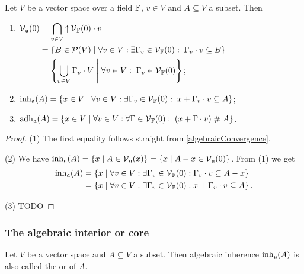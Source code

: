 \begin{lemma}
Let $V$ be a vector space over a field $\mathbb{F}$, $v\in V$ and $A\subseteq V$ a subset. Then
\begin{enumerate}
\item $\begin{aligned}[t]
\operatorname{\mathcal{V}}_\mathfrak{a}(0) &= \bigcap_{v\in V} \operatorname{\uparrow} \operatorname{\mathcal{V}}_{\mathbb{F}}(0)\cdot v \\
&= \left\{ B\in \operatorname{\mathcal{P}}(V) \;\middle|\; \forall v\in V: \exists \Gamma_v\in \operatorname{\mathcal{V}}_{\mathbb{F}}(0):\; \Gamma_v\cdot v\subseteq B \right\} \\
&= \left\{ \bigcup_{v\in V} \Gamma_v\cdot V \;\middle|\; \forall v\in V:\; \Gamma_v \in \operatorname{\mathcal{V}}_{\mathbb{F}}(0) \right\};
\end{aligned}$
\item $\operatorname{inh}_\mathfrak{a}(A) = \left\{ x\in V \;\middle|\; \forall v\in V:\exists \Gamma_v \in \operatorname{\mathcal{V}}_{\mathbb{F}}(0):\; x + \Gamma_v\cdot v \subseteq A \right\}$;
\item $\operatorname{adh}_\mathfrak{a}(A) = \left\{ x\in V \;\middle|\; \forall v\in V: \forall \Gamma\in\operatorname{\mathcal{V}}_{\mathbb{F}}(0):\; (x+\Gamma\cdot v)\mathrel{\#} A \right\}$.
\end{enumerate}
\end{lemma}
\begin{proof}
(1) The first equality follows straight from \ref{algebraicConvergence}.

(2) We have $\operatorname{inh}_\mathfrak{a}(A) = \left\{ x \;\middle|\; A\in \operatorname{\mathcal{V}}_\mathfrak{a}(x) \right\} = \left\{ x \;\middle|\; A-x\in \operatorname{\mathcal{V}}_\mathfrak{a}(0) \right\}$. From (1) we get 
\begin{align*}
\operatorname{inh}_\mathfrak{a}(A) &= \left\{ x \;\middle|\; \forall v\in V: \exists \Gamma_v\in \operatorname{\mathcal{V}}_{\mathbb{F}}(0): \Gamma_v\cdot v \subseteq A-x \right\} \\
&= \left\{ x \;\middle|\; \forall v\in V: \exists \Gamma_v\in \operatorname{\mathcal{V}}_{\mathbb{F}}(0): x + \Gamma_v\cdot v \subseteq A \right\}.
\end{align*}

(3) TODO
\end{proof}

\subsubsection{The algebraic interior or core}
\begin{definition}
Let $V$ be a vector space and $A\subseteq V$ a subset. Then algebraic inherence $\operatorname{inh}_\mathfrak{a}(A)$ is also called the  or  of $A$.
\end{definition}


